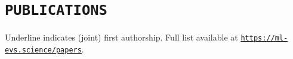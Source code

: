 \documentclass[11pt,a4paper,sans]{moderncv}        %
\newcommand{\colourhref}[2]{\setulcolor{red}\href{#1}{\underline{#2}}}
\begin{document}

\clearpage
\section{\texttt{PUBLICATIONS}}
Underline indicates (joint) first authorship. Full list available at \colourhref{https://ml-evs.science/papers}{\texttt{https://ml-evs.science/papers}}.
\nocite{*}
\printbibliography[heading=none] %


\pagestyle{fancy}
\end{document}
